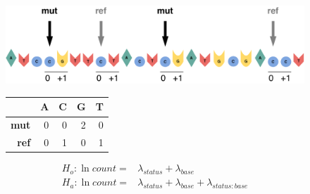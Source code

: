 \begin{figure}[h!]
  \begin{minipage}[c]{\textwidth}
    \includegraphics[width=\textwidth]{graphics/flank_demo.pdf}
  \end{minipage}\hfill
  \vspace{1cm}
  
  \begin{minipage}[c]{0.48\textwidth}
  \centering
    \begin{tabulary}{\columnwidth}{rRRRR}
    \toprule
        & \textbf{A} & \textbf{C} & \textbf{G} & \textbf{T}  \\
    \hline
        \textbf{mut} & 0 & 0 & 2 & 0  \\
        \textbf{ref} & 0 & 1 & 0 & 1  \\
    \bottomrule
    \end{tabulary}
  \end{minipage}\hfill
  \begin{minipage}[c]{0.48\textwidth}
    \begin{equation}
        \begin{aligned}
            H_o: \ln{count} =& \lambda_{status} + \lambda_{base} \\
            H_a: \ln{count} =& \lambda_{status} + \lambda_{base} + \lambda_{status:base}
        \end{aligned}
        \label{eq:nbr_demo}
    \end{equation}
  \end{minipage}
  \vspace{0.5cm}
  
  \begin{minipage}[c]{\textwidth}
    \caption{
    } \label{fig:nbr_demo}
  \end{minipage}
\end{figure}
